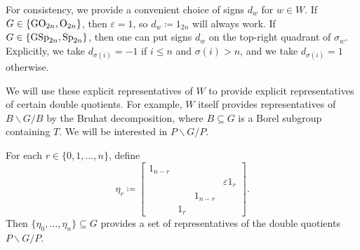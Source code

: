 \begin{remark}
    For consistency, we provide a convenient choice of signs $d_w$ for $w\in W$. If $G\in\{\mathrm{GO}_{2n},\mathrm{O}_{2n}\}$, then $\varepsilon=1$, so $d_w\coloneqq1_{2n}$ will always work. If $G\in\{\mathrm{GSp}_{2n},\mathrm{Sp}_{2n}\}$, then one can put signs $d_w$ on the top-right quadrant of $\sigma_w$. Explicitly, we take $d_{\sigma(i)}=-1$ if $i\le n$ and $\sigma(i)>n$, and we take $d_{\sigma(i)}=1$ otherwise.
\end{remark}
We will use these explicit representatives of $W$ to provide explicit representatives of certain double quotients. For example, $W$ itself provides representatives of $B\backslash G/B$ by the Bruhat decomposition, where $B\subseteq G$ is a Borel subgroup containing $T$. We will be interested in $P\backslash G/P$.
\begin{lemma} \label{lem:compute-pgp}
    For each $r\in\{0,1,\ldots,n\}$, define
    \[\eta_r\coloneqq\begin{bmatrix}
        1_{n-r} \\ &&& \varepsilon1_r \\
        && 1_{n-r} \\
        & 1_r
    \end{bmatrix}.\]
    Then $\{\eta_0,\ldots,\eta_n\}\subseteq G$ provides a set of representatives of the double quotients $P\backslash G/P$.
\end{lemma}

